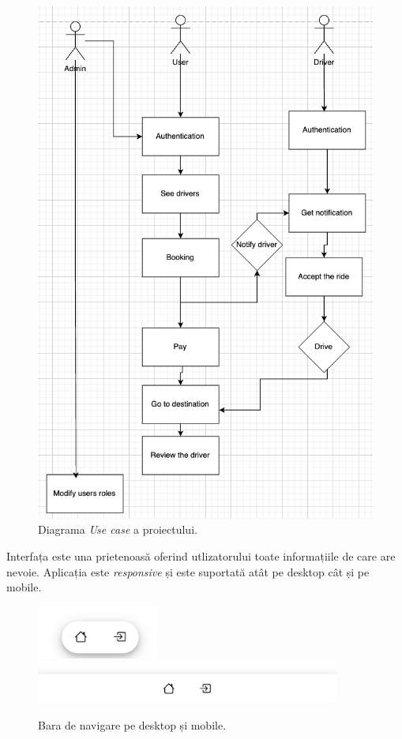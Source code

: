 \begin{figure}[H]
    \centering
    \includegraphics[width=15cm]{Assets/UserCase.png}
    \caption{Diagrama \textit{Use case} a proiectului.}
    \label{fig:UserCase}
\end{figure}

Interfața este una prietenoasă oferind utlizatorului toate informațiile de care are nevoie.
Aplicația este \textit{responsive} și este suportată atât pe desktop cât și pe mobile.

\begin{figure}[H]
    \centering
    \includegraphics[width=4cm]{Assets/responsive1.png}
    \includegraphics[width=10cm]{Assets/responsive2.png}
    \caption{Bara de navigare pe desktop și mobile.}
    \label{fig:responsive}
\end{figure}

